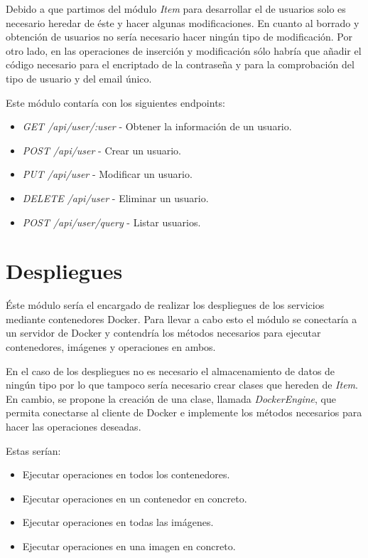 \bigskip
Debido a que partimos del módulo \textit{Item} para desarrollar el de usuarios solo es necesario heredar de éste y hacer algunas modificaciones. En cuanto al borrado y obtención de usuarios no sería necesario hacer ningún tipo de modificación. Por otro lado, en las operaciones de inserción y modificación sólo habría que añadir el código necesario para el encriptado de la contraseña y para la comprobación del tipo de usuario y del email único.

\bigskip
Este módulo contaría con los siguientes endpoints:
\begin{itemize}
	\item \textit{GET /api/user/:user} - Obtener la información de un usuario.
	\item \textit{POST /api/user} - Crear un usuario.
	\item \textit{PUT /api/user} - Modificar un usuario.
	\item \textit{DELETE /api/user} - Eliminar un usuario.
	\item \textit{POST /api/user/query} - Listar usuarios.
\end{itemize} 





\section{Despliegues}

Éste módulo sería el encargado de realizar los despliegues de los servicios mediante contenedores Docker. Para llevar a cabo esto el módulo se conectaría a un servidor de Docker y contendría los métodos necesarios para ejecutar contenedores, imágenes y operaciones en ambos.

\bigskip
En el caso de los despliegues no es necesario el almacenamiento de datos de ningún tipo por lo que tampoco sería necesario crear clases que hereden de \textit{Item}. En cambio, se propone la creación de una clase, llamada \textit{DockerEngine}, que permita conectarse al cliente de Docker e implemente los métodos necesarios para hacer las operaciones deseadas.

\bigskip
Estas serían:
\begin{itemize}
	\item Ejecutar operaciones en todos los contenedores.
	\item Ejecutar operaciones en un contenedor en concreto.
	\item Ejecutar operaciones en todas las imágenes.
	\item Ejecutar operaciones en una imagen en concreto.
\end{itemize}


